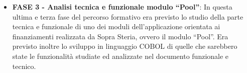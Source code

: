 \begin{itemize}
		\item \textbf{FASE 3 - Analisi tecnica e funzionale modulo “Pool”}: In questa ultima e terza fase del percorso formativo era previsto lo studio della parte tecnica e funzionale di uno dei moduli dell'applicazione orientata ai finanziamenti realizzata da Sopra Steria, ovvero il modulo “Pool”. Era previsto inoltre lo sviluppo in linguaggio COBOL di quelle che sarebbero state le funzionalità studiate ed analizzate nel documento funzionale e tecnico.%

	\end{itemize}
\leavevmode	\newline

